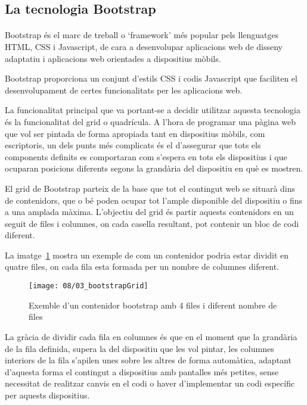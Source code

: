 \subsection{La tecnologia Bootstrap}\label{sec:bootstrap}

    \paragraph{}
    Bootstrap és el marc de treball o `framework' més popular pels llenguatges HTML, CSS i Javascript, de cara a desenvolupar aplicacions web de disseny adaptatiu i aplicacions web orientades a dispositius mòbils.

    Bootstrap proporciona un conjunt d'estils CSS i codis Javascript que faciliten el desenvolupament de certes funcionalitats per les aplicacions web.

    La funcionalitat principal que va portant-se a decidir utilitzar aquesta tecnologia és la funcionalitat del grid o quadrícula. A l'hora de programar una pàgina web que vol ser pintada de forma apropiada tant en dispositius mòbils, com escriptoris, un dels punts més complicats és el d'assegurar que tots els components definits es comportaran com s'espera en tots els dispositius i que ocuparan posicions diferents segons la grandària del dispositiu en què es mostren.

    El grid de Bootstrap parteix de la base que tot el contingut web se situarà dins de contenidors, que o bé poden ocupar tot l'ample disponible del dispositiu o fins a una amplada màxima. L’objectiu del grid és partir aquests contenidors en un seguit de files i columnes, on cada casella resultant, pot contenir un bloc de codi diferent.

    La imatge~\ref{img:gridSimple} mostra un exemple de com un contenidor podria estar dividit en quatre files, on cada fila esta formada per un nombre de columnes diferent.

    \begin{figure}[h]
        \texttt{[image: 08/03\_bootstrapGrid]}
        \centering
        \caption{Exemble d'un contenidor bootstrap amb 4 files i diferent nombre de files}\label{img:gridSimple}
    \end{figure}

    La gràcia de dividir cada fila en columnes és que en el moment que la grandària de la fila definida, supera la del dispositiu que les vol pintar, les columnes interiors de la fila s'apilen unes sobre les altres de forma automàtica, adaptant d'aquesta forma el contingut a dispositius amb pantalles més petites, sense necessitat de realitzar canvis en el codi o haver d'implementar un codi específic per aquests dispositius.

